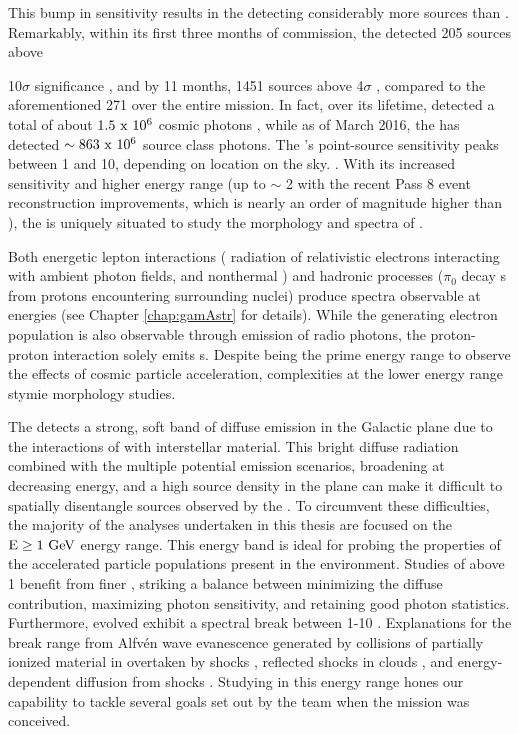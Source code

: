 This bump in sensitivity results in the \lat{} detecting considerably more sources than \egret. Remarkably, within its first three months of commission, the \lat{} detected 205 sources above {\rm 10$\sigma$ significance \citep{lat_3m}, and by 11 months, 1451 sources above 4$\sigma$ \citep{1FGL}, compared to  the aforementioned 271 over the entire \egret{} mission. In fact, over its lifetime, \egret{} detected a total of about ${\rm 1.5~x~10^6}$ cosmic photons \citep{Thomson93}, while as of March 2016, the \lat{} has detected ${\rm \sim 863~x~10^6}$  source class photons. The \lat's point-source sensitivity peaks between 1 and 10\gev{}, depending on location on the sky. . With its increased sensitivity and higher energy range (up to $\sim$ 2\tev{} with the recent Pass 8 event reconstruction improvements, which is nearly an order of magnitude higher than \egret{}), the \lat{} is uniquely situated to study the \gam{} morphology and spectra of \snrs{}.

Both energetic lepton interactions (\ie \ic{} radiation of relativistic electrons interacting with ambient photon fields, and nonthermal \brems{}) and hadronic processes ($\pi_0$ decay \gam{}s from \cray{} protons encountering surrounding nuclei) produce spectra observable at \gam{} energies (see Chapter \ref{chap:gamAstr} for details). While the \ic{} generating electron population is also observable through emission of radio \sync{} photons, the proton-proton interaction solely emits \gam{}s. Despite being the prime energy range to observe the effects of cosmic particle acceleration, complexities at the lower \lat{} energy range stymie \snr{} morphology studies.

The \lat{} detects a strong, soft band of diffuse emission in the Galactic plane due to the interactions of  \crs{} with interstellar material. This bright diffuse radiation combined with the multiple potential emission scenarios, broadening \psf{} at decreasing energy, and a high source density in the plane can make it difficult to spatially disentangle sources observed by the \lat{}. To circumvent these 
difficulties, the majority of the analyses undertaken in this thesis are focused on the ${\rm E \geq 1~\mathrm{GeV}}$ energy range. This energy band is ideal for probing the properties of the accelerated particle populations present in the \snr{} environment. Studies of  \snrs{}  above 1\gev{} benefit from finer \lat{} \psf{}, striking a balance between minimizing the diffuse contribution, maximizing photon sensitivity, and retaining good photon statistics. Furthermore, evolved \snrs{}  exhibit a spectral break between 1-10\gev{} \citep{Hewitt15}. Explanations for the break range from Alfv\' en wave evanescence generated by collisions of partially ionized material in \mcs{} overtaken by \snr{}  shocks \citep{Malkov11}, reflected shocks in clouds \cite{Inoue10c}, and energy-dependent diffusion from shocks \cite{Ohira11}. Studying \snrs{} in this energy range hones our capability to tackle several goals set out by the \Fermi{} team when the mission was conceived.

}
